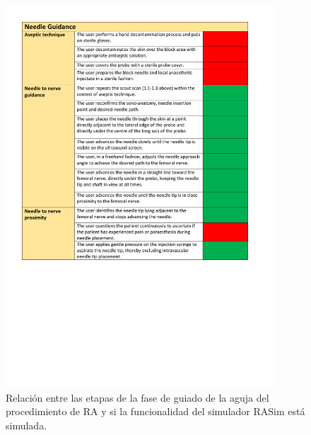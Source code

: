 \begin{figure}[ht]
    \centering
    \includegraphics[trim={1cm 85mm 1cm 1cm},clip,width=0.9\textwidth]{PDFs/RA2.pdf}
       \caption{Relación entre las etapas de la fase de guiado de la aguja del procedimiento de \acs{RA} y si la funcionalidad del simulador \acs{RASim} está simulada.\label{fig:RAsteps2} }
    
\end{figure}
